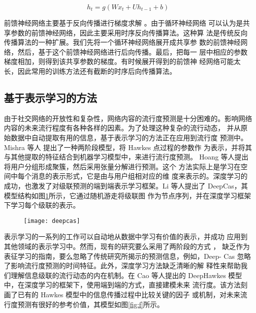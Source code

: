 \begin{equation}\label{eq:2-rnn}
h_t = g(Wx_t + Uh_{t-1} + b)
\end{equation}

前馈神经网络主要基于反向传播进行梯度求解 \citep{Rumelhart1988Learning,Werbos1994The}。由于循环神经网络 可以认为是共享参数的前馈神经网络，因此主要采用时序反向传播算法。这种算 法是传统反向传播算法的一种扩展。我们先将一个循环神经网络展开成共享参 数的前馈神经网络，然后，基于这个前馈神经网络进行后向传播。最后，把每一 层中相应的参数梯度相加，则得到该共享参数的梯度。有时候展开得到的前馈神 经网络可能太长，因此常用的训练方法还有截断的时序后向传播算法。
\subsection{基于表示学习的方法}
由于社交网络的开放性和复杂性，网络内容的流行度预测是十分困难的。影响网络内容的未来流行程度有各种各样的因素。为了处理这种复杂的流行动态， 并从原始数据中自动提取有用的信息，基于表示学习的方法正在应用到流行度 预测中。Mishra 等人 \citep{Mishra2016Feature}提出了一种两阶段模型，将 Hawkes 点过程的参数作 为表示，并将其与其他提取的特征结合到机器学习模型中，来进行流行度预测。 Hoang 等人\citep{Hoang2017GPOP}提出将用户分组形成聚簇，然后采用张量分解进行预测。这个 方法实际上是学习在空间中每个消息的表示形式，它是由与用户组相对应的维 度来表示的。深度学习的成功，也激发了对级联预测的端到端表示学习框架。Li 等人\citep{Li2016DeepCas}提出了 DeepCas，其模型结构如图\ref{fig:deepcas}所示，它通过随机游走将级联图 作为节点序列，并在深度学习框架下学习每个级联的表示。

\begin{figure}[!htbp]
    \centering
    \texttt{[image: deepcas]}
    \label{fig:deepcas}
\end{figure}


表示学习的一系列的工作可以自动地从数据中学习有价值的表示，并成功 应用到其他领域的表示学习中。然而，现有的研究要么采用了两阶段的方式 \citep{Mishra2016Feature}， 缺乏作为表征学习的指南，要么忽略了传统研究所揭示的预测信息，例如，Deep- Cas\citep{Li2016DeepCas} 忽略了影响流行度预测的时间特征。此外，深度学习方法缺乏清晰的解 释性来帮助我们理解信息级联的流行动态的内在机制。在 Cao 等人\citep{Cao2017DeepHawkes}提出的 DeepHawkes 模型中，在深度学习的框架下，使用端到端的方式，直接建模未来 流行度。该方法刻画了已有的 Hawkes 模型中的信息传播过程中比较关键的因子 或机制，对未来流行度预测有很好的参考价值，其模型如图\ref{fig:f}所示。


